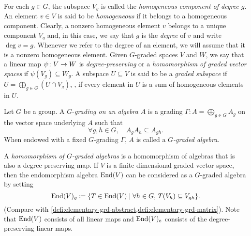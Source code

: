 For each $g\in G$, the subspace $V_g$ is called the \emph{homogeneous component of degree $g$}. 
An element $v \in V$ is said to be \emph{homogeneous} if it belongs to a homogeneous component. 
Clearly, a nonzero homogeneous element $v$ belongs to a unique component $V_g$ and, in this case, we say that $g$ is the \emph{degree} of $v$ and write $\deg v = g$. 
Whenever we refer to the degree of an element, we will assume that it is a nonzero homogeneous element. 
\label{homogeneousMap} Given $G$-graded spaces $V$ and $W$, we say that a linear map $\psi\colon V \to W$ is \emph{degree-preserving} or a \emph{homomorphism of graded vector spaces}
if $\psi(V_g) \subseteq W_g$. 
A subspace $U\subseteq V$ is said to be a \emph{graded subspace} if $U = \bigoplus_{g\in G} (U\cap V_g)$, \ie, if every element in $U$ is a sum of homogeneous elements in $U$. 

\begin{defi}\label{def:grading}
	Let $G$ be a group. 
	A $G$-\emph{grading on an algebra} $A$ is 
    a grading 
	$
	    \Gamma : A= \bigoplus_{g \in G} A_g
	$ on the vector space underlying $A$
	such that 
	\[
	    \forall g, h\in G, \quad
	    A_g A_h \subseteq A_{gh}.
	\]
	When endowed with a fixed $G$-grading $\Gamma$, $A$ is called a \emph{$G$-graded algebra}. 
\end{defi}

A \emph{homomorphism of $G$-graded algebras} is a homomorphism of algebras that is also a degree-preserving map. 
If $V$ is a finite dimensional graded vector space, then the endomorphism algebra $\operatorname{End}(V)$ can be considered as a $G$-graded algebra by setting 
\[\label{eq:elementary-1st}
    \operatorname{End}(V)_g \coloneqq \{ T\in \operatorname{End}(V) \mid \forall h\in G,\, T(V_h) \subseteq V_{gh} \}.
\]
(Compare with \cref{defi:elementary-grd-abstract,defi:elementary-grd-matrix}).
Note that $\operatorname{End}(V)$ consists of all linear maps and $\operatorname{End}(V)_e$ consists of the degree-preserving linear maps.



